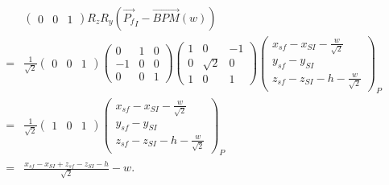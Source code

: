 \documentclass{article}
\begin{document}
\begin{eqnarray*}
& & \left( 
\begin{array}{ccc}
	0 & 0 & 1
\end{array} \right) R_z R_y \left( \vec{P_f}_I - \vec{BPM}(w) \right) \\
& = & \frac{1}{\sqrt{2}} \left(
\begin{array}{ccc}
	0 & 0 & 1
\end{array} \right) \left(
\begin{array}{ccc}
	0 & 1 & 0 \\
	-1 & 0 & 0 \\
	0 & 0 & 1
\end{array} \right) \left(
\begin{array}{ccc}
	1 & 0 & -1 \\
	0 & \sqrt{2} & 0 \\
	1 & 0 & 1
\end{array} \right) \left(
\begin{array}{c}
	x_{sf} - x_{SI} - \frac{w}{\sqrt{2}} \\
	y_{sf} - y_{SI} \\
	z_{sf} - z_{SI} - h - \frac{w}{\sqrt{2}}
\end{array} \right)_P \\
& = & \frac{1}{\sqrt{2}} \left(
\begin{array}{ccc}
	1 & 0 & 1
\end{array} \right) \left(
\begin{array}{c}
	x_{sf} - x_{SI} - \frac{w}{\sqrt{2}} \\
	y_{sf} - y_{SI} \\
	z_{sf} - z_{SI} - h - \frac{w}{\sqrt{2}}
\end{array} \right)_P \\
& = & \frac{x_{sf}-x_{SI}+z_{sf}-z_{SI}-h}{\sqrt{2}} - w. \\
\end{eqnarray*}
\end{document}
